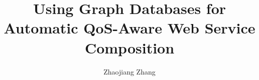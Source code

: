\documentclass[12pt, a4paper, twoside, openright]{book}
\begin{document}
\frontmatter


\title{Using Graph Databases for Automatic QoS-Aware Web Service Composition}
\author{Zhaojiang Zhang}

\subject{Software Engineering}




\phd

\makeatletter
\let\OLDappendix\appendix
\newif\if@appendixinbackmatter
\renewenvironment{appendix}
{
  \if@mainmatter
     \@appendixinbackmatterfalse\OLDappendix
  \else
      \@appendixinbackmattertrue\@mainmattertrue\OLDappendix
\fi
}
\makeatother





\maketitle



\tableofcontents



\mainmatter









\backmatter 
\renewcommand\bibname{References} 
%


%
\end{document}
